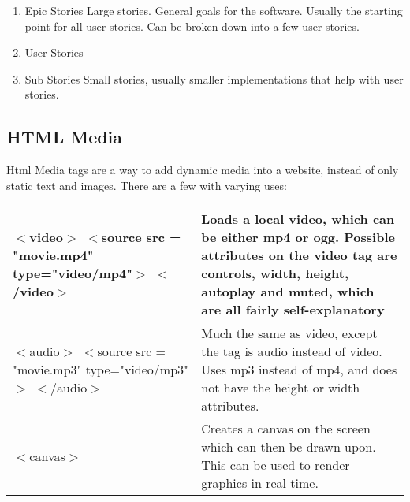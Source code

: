 \documentclass[portfolio.tex.tex]{subfiles}
\begin{document}
				\begin{enumerate}
					\item Epic Stories
						\subitem Large stories.
						\subitem General goals for the software.
						\subitem Usually the starting point for all user stories.
						\subitem Can be broken down into a few user stories.
					\item User Stories
					\item Sub Stories
						\subitem Small stories, usually smaller implementations that help with user stories.
				\end{enumerate}

			\vspace{0.5cm}
			\hspace{-0.5cm}

			\subsection{HTML Media}
				Html Media tags are a way to add dynamic media into a website, instead of only static text and images. There are a few with varying uses:\\

				\hspace{-0.8cm}
				\begin{tabular}{|p{9cm}|p{6cm}|}
					\hline
					$<$video$>$ \newline
					$<$source src = "movie.mp4" type="video/mp4"$>$ \newline
					$<$/video$>$
					& Loads a local video, which can be either mp4 or ogg. Possible attributes on the video tag are controls, width, height, autoplay and muted, which are all fairly self-explanatory \autocite{w3-video}\\
					\hline
					$<$audio$>$ \newline
					$<$source src = "movie.mp3" type="video/mp3"$>$ \newline
					$<$/audio$>$&  Much the same as video, except the tag is audio instead of video. Uses mp3 instead of mp4, and does not have the height or width attributes. \autocite{w3-audio}\\
					\hline
					$<$canvas$>$& Creates a canvas on the screen which can then be drawn upon. This can be used to render graphics in real-time.  \\
					\hline
				\end{tabular}
\end{document}
